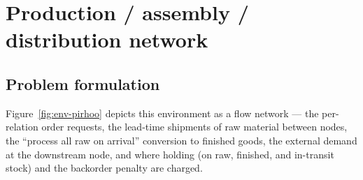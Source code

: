 \section{Production / assembly / distribution network}
\label{sec:pirhoo}

\subsection{Problem formulation}
\label{sec:pirhoo-formulation}

Figure~\ref{fig:env-pirhoo} depicts this environment as a flow network --- the per-relation order
requests, the lead-time shipments of raw material between nodes, the ``process all raw on arrival''
conversion to finished goods, the external demand at the downstream node, and where holding (on raw,
finished, and in-transit stock) and the backorder penalty are charged.

